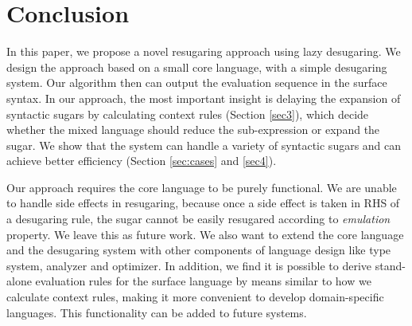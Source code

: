 \section{Conclusion}
\label{sec7}


In this paper, we propose a novel resugaring approach using lazy desugaring. We design the approach based on a small core language, with a simple desugaring system. Our algorithm then can output the evaluation sequence in the surface syntax. In our approach, the most important insight is delaying the expansion of syntactic sugars by calculating context rules (Section \ref{sec3}), which decide whether the mixed language should reduce the sub-expression or expand the sugar. We show that the system can handle a variety of syntactic sugars and can achieve better efficiency (Section \ref{sec:cases} and \ref{sec4}).

Our approach requires the core language to be purely functional. We are unable to handle side effects in resugaring, because once a side effect is taken in RHS of a desugaring rule, the sugar cannot be easily resugared according to \emph{emulation} property. We leave this as future work. We also want to extend the core language and the desugaring system with other components of language design like type system, analyzer and optimizer. In addition, we find it is possible to derive stand-alone evaluation rules for the surface language by means similar to how we calculate context rules, making it more convenient to develop domain-specific languages. This functionality can be added to future systems.
